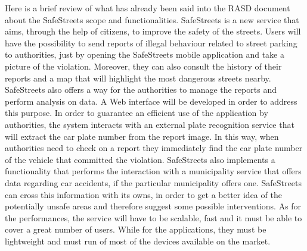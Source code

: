 Here is a brief review of what has already been said into the RASD document about the SafeStreets scope and functionalities.
\newline
SafeStreets is a new service that aims, through the help of citizens, to improve the safety of the streets. Users will have the possibility to send reports of illegal behaviour related to street parking to authorities, just by opening the SafeStreets mobile application and take a picture of the violation. Moreover, they can also consult the history of their reports and a map that will highlight the most dangerous streets nearby. SafeStreets also offers a way for the authorities to manage the reports and perform analysis on data. A Web interface will be developed in order to address this purpose. In order to guarantee an efficient use of the application by authorities, the system interacts with an external plate recognition service that will extract the car plate number from the report image. In this way, when authorities need to check on a report they immediately find the car plate number of the vehicle that committed the violation. SafeStreets also implements a functionality that performs the interaction with a municipality service that offers data regarding car accidents, if the particular municipality offers one. SafeStreets can cross this information with its owns, in order to get a better idea of the potentially unsafe areas and therefore suggest some possible interventions.
As for the performances, the service will have to be scalable,
fast and it must be able to cover a great number of users. While for the applications, they must be lightweight and must run of most of the devices available on the market.
